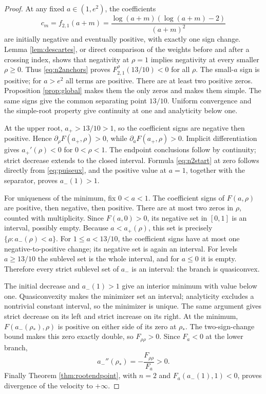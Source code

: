 \documentclass[11pt]{article}
\numberwithin{equation}{section}
\theoremstyle{definition}\newtheorem{definition}[theorem]{Definition}
\theoremstyle{remark}\newtheorem{remark}[theorem]{Remark}
\begin{document}
\begin{proof}
At any fixed $a\in(1,e^2)$, the coefficients
\[
c_m=f_{2,1}(a+m)=\frac{\log(a+m)(\log(a+m)-2)}{(a+m)^2}
\]
are initially negative and eventually positive, with exactly one sign change. Lemma \ref{lem:descartes}, or direct comparison of the weights before and after a crossing index, shows that negativity at $\rho=1$ implies negativity at every smaller $\rho\geq0$. Thus \eqref{eq:n2anchors} proves $F_{2,1}^{\rho}(13/10)<0$ for all $\rho$. The small-$a$ sign is positive; for $a>e^2$ all terms are positive. There are at least two positive zeros. Proposition \ref{prop:global} makes them the only zeros and makes them simple. The same signs give the common separating point $13/10$. Uniform convergence and the simple-root property give continuity at one and analyticity below one.

At the upper root, $a_+>13/10>1$, so the coefficient signs are negative then positive. Hence $\partial_\rho F(a_+,\rho)>0$, while $\partial_aF(a_+,\rho)>0$. Implicit differentiation gives $a_+'(\rho)<0$ for $0<\rho<1$. The endpoint conclusions follow by continuity; strict decrease extends to the closed interval. Formula \eqref{eq:n2start} at zero follows directly from \eqref{eq:puiseux}, and the positive value at $a=1$, together with the separator, proves $a_-(1)>1$.

For uniqueness of the minimum, fix $0<a<1$. The coefficient signs of $F(a,\rho)$ are positive, then negative, then positive. There are at most two zeros in $\rho$, counted with multiplicity. Since $F(a,0)>0$, its negative set in $[0,1]$ is an interval, possibly empty. Because $a<a_+(\rho)$, this set is precisely $\{\rho:a_-(\rho)<a\}$. For $1\leq a<13/10$, the coefficient signs have at most one negative-to-positive change; its negative set is again an interval. For levels $a\geq13/10$ the sublevel set is the whole interval, and for $a\leq0$ it is empty. Therefore every strict sublevel set of $a_-$ is an interval: the branch is quasiconvex.

The initial decrease and $a_-(1)>1$ give an interior minimum with value below one. Quasiconvexity makes the minimizer set an interval; analyticity excludes a nontrivial constant interval, so the minimizer is unique. The same argument gives strict decrease on its left and strict increase on its right. At the minimum, $F(a_-(\rho_*),\rho)$ is positive on either side of its zero at $\rho_*$. The two-sign-change bound makes this zero exactly double, so $F_{\rho\rho}>0$. Since $F_a<0$ at the lower branch,
\[
a_-''(\rho_*)=-\frac{F_{\rho\rho}}{F_a}>0.
\]
Finally Theorem \ref{thm:rootendpoint}, with $n=2$ and $F_a(a_-(1),1)<0$, proves divergence of the velocity to $+\infty$.
\end{proof}
\end{document}
